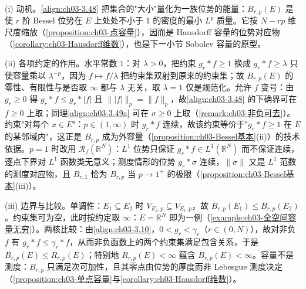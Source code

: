 \documentclass[../../main.tex]{subfiles}%
\begin{document}
\begin{remark}\label{remark:ch03-Bessel容量动机}
(i) 动机。\eqref{align:ch03-3.48} 把集合的"大小"量化为一族位势的能量：$B_{r,p}(E)$ 是使 $r$ 阶 Bessel 位势在 $E$ 上处处不小于 $1$ 的密度的最小 $L^p$ 质量。它按 $N-rp$ 维尺度缩放（\cref{proposition:ch03-点容量}），因而是 Hausdorff 容量的位势对应物（\cref{corollary:ch03-Hausdorff维数}），也是下一小节 Sobolev 容量的原型。

(ii) 各项约定的作用。水平常数 $1$：对 $\lambda>0$，把约束 $g_r*f\geqslant1$ 换成 $g_r*f\geqslant\lambda$ 只使容量乘以 $\lambda^{-p}$，因为 $f\mapsto f/\lambda$ 把约束集双射到原来的约束集；故 $B_{r,p}(E)$ 的零性、有限性与是否取 $\infty$ 都与 $\lambda$ 无关，取 $\lambda=1$ 仅是规范化。允许 $f$ 变号：由 $g_r\geqslant0$ 得 $g_r*f\leqslant g_r*|f|$ 且 $\||f|\|_p=\|f\|_p$，故\eqref{align:ch03-3.48} 的下确界可在 $f\geqslant0$ 上取；同理\eqref{align:ch03-3.49a} 可在 $\sigma\geqslant0$ 上取（\cref{remark:ch03-非负可去}）。约束"对每个 $x\in E$"：$p\in(1,\infty)$ 时 $g_r*f$ 连续，故该约束等价于"$g_r*f\geqslant1$ 在 $E$ 的某邻域内"，这正是 $B_{r,p}$ 成为外容量（\cref{proposition:ch03-Bessel基本}(ii)）的技术依据。$p=1$ 时改用 $\mathscr{R}_f(\mathbb{R}^N)$：$L^1$ 位势只保证 $g_r*f\in L^1(\mathbb{R}^N)$ 而不保证连续，逐点下界对 $L^1$ 函数类无意义；测度情形的位势 $g_r*\sigma$ 连续，$\|\sigma\|$ 又是 $L^1$ 范数的测度对应物，且 $B_{r,1}$ 恰为 $B_{r,p}$ 当 $p\to1^+$ 的极限（\cref{proposition:ch03-Bessel基本}(iii)）。

(iii) 边界与比较。单调性：$E_1\subseteq E_2$ 时 $V_{E_2,p}\subseteq V_{E_1,p}$，故 $B_{r,p}(E_1)\leqslant B_{r,p}(E_2)$。约束集可为空，此时按约定取 $\infty$：$E=\mathbb{R}^N$ 即为一例（\cref{example:ch03-全空间容量无穷}）。两核比较：由\eqref{align:ch03-3.10}，$0<g_r<\gamma_r$（$r\in(0,N)$），故对非负 $f$ 有 $g_r*f\leqslant\gamma_r*f$，从而非负函数上的两个约束集满足包含关系，于是 $B_{r,p}(E)\leqslant R_{r,p}(E)$；特别地 $R_{r,p}(E)<\infty$ 蕴含 $B_{r,p}(E)<\infty$。容量不是测度：$B_{r,p}$ 只满足次可加性，且其零点由位势的厚度而非 Lebesgue 测度决定（\cref{proposition:ch03-单点容量}与\cref{corollary:ch03-Hausdorff维数}）。
\end{remark}
\end{document}
